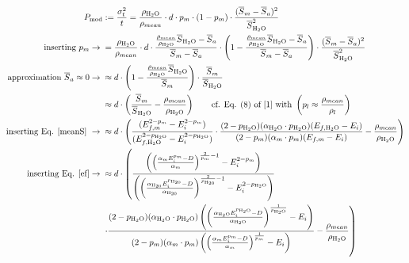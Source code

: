 \documentclass{article}
\begin{document}
\begin{align}
    P_{\text{mod}} &:= \frac{\sigma_t^2}{t} = \frac{\rho_{\ce{H2O}}}{\rho_{mean}} \cdot d \cdot p_m\cdot (1-p_m)\cdot \frac{(\overline{S}_m-\overline{S}_a)^2}{\overline{S}_{\ce{H2O}}^2}\\
    \text{inserting}~p_m \rightarrow{} &= \frac{\rho_{\ce{H2O}}}{\rho_{mean}} \cdot d \cdot \frac{\frac{\rho_{mean}}{\rho_{\ce{H2O}}}\overline{S}_{\ce{H2O}} - \overline{S}_a}{\overline{S}_m - \overline{S}_a} \cdot \left(1-\frac{\frac{\rho_{mean}}{\rho_{\ce{H2O}}}\overline{S}_{\ce{H2O}} - \overline{S}_a}{\overline{S}_m - \overline{S}_a}\right)\cdot \frac{(\overline{S}_m-\overline{S}_a)^2}{\overline{S}_{\ce{H2O}}^2}  \\
    \text{approximation }\overline{S}_a \approx 0 \rightarrow{}&\approx  d \cdot \left(1-\frac{\frac{\rho_{mean}}{\rho_{\ce{H2O}}}\overline{S}_{\ce{H2O}}}{\overline{S}_m}\right)\cdot \frac{\overline{S}_m}{\overline{S}_{\ce{H2O}}} \\
    &\approx d \cdot \left(\frac{\overline{S}_m}{\overline{S}_{\ce{H2O}}}-\frac{\rho_{mean}}{\rho_{\ce{H2O}}}\right) \qquad \text{cf. Eq. (8) of [1] with }\left(p_l\approx\frac{\rho_{mean}}{\rho_l}\right) \\
    \text{inserting Eq. \ref{meanS}}~ \rightarrow{} &\approx d \cdot \left(\frac{(E_{f,m}^{2-p_m}-E_i^{2-p_m})}{(E_{f,\ce{H2O}}^{2-p_{\ce{H2O}}}-E_i^{2-p_{\ce{H2O}}})}\cdot \frac{(2-p_{\ce{H2O}})(\alpha_{\ce{H2O}} \cdot p_{\ce{H2O}})(E_{f,\ce{H2O}}-E_i)}{(2-p_m)(\alpha_m \cdot p_m)(E_{f,m}-E_i)}-\frac{\rho_{mean}}{\rho_{\ce{H2O}}}\right)\\
    \text{inserting Eq. \ref{ef}} \rightarrow{} &\approx d \cdot \left(\frac{\left(\left(\frac{\alpha_m E_i^{p_m}-D}{\alpha_m}\right)^{\frac{2}{p_m}-1}-E_i^{2-p_m}\right)}{\left(\left(\frac{\alpha_{\ce{H20}} E_i^{p_{\ce{H20}}}-D}{\alpha_{\ce{H20}}}\right)^{\frac{2}{p_{\ce{H20}}}-1}-E_i^{2-p_{\ce{H2O}}}\right)}\right.\\
    &\left.\cdot \frac{(2-p_{\ce{H2O}})(\alpha_{\ce{H2O}} \cdot p_{\ce{H2O}})\left(\left(\frac{\alpha_{\ce{H2O}} E_i^{p_{\ce{H2O}}}-D}{\alpha_{\ce{H2O}}}\right)^{\frac{1}{p_{\ce{H2O}}}}-E_i\right)}{(2-p_m)(\alpha_m \cdot p_m)\left(\left(\frac{\alpha_m E_i^{p_m}-D}{\alpha_m}\right)^{\frac{1}{p_m}}-E_i\right)}-\frac{\rho_{mean}}{\rho_{\ce{H2O}}}\right) 
\end{align}
\end{document}
